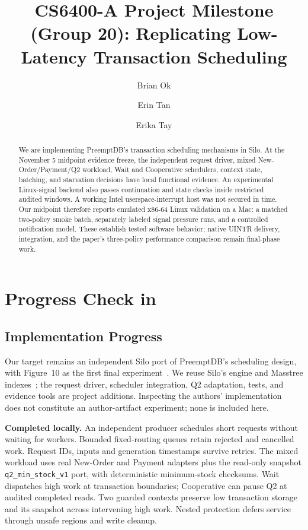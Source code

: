 \documentclass[sigconf,nonacm]{acmart}
\newcommand{\minihead}[1]{{\vspace{.45em}\noindent\textbf{#1.} }}
\begin{document}
\title{CS6400-A Project Milestone (Group 20): Replicating Low-Latency Transaction Scheduling}
\author{Brian Ok}
\author{Erin Tan}
\author{Erika Tay}
\begin{abstract}
We are implementing PreemptDB's transaction scheduling mechanisms in Silo.
At the November 5 midpoint evidence freeze, the independent request driver,
mixed New-Order/Payment/Q2 workload, Wait and Cooperative schedulers, context
state, batching, and starvation decisions have local functional evidence.
An experimental Linux-signal backend also passes continuation and state checks
inside restricted audited windows. A working Intel userspace-interrupt host
was not secured in time. Our midpoint therefore reports emulated x86-64 Linux
validation on a Mac: a matched two-policy smoke batch, separately labeled
signal pressure runs, and a controlled notification model. These establish
tested software behavior; native UINTR delivery, integration, and the paper's
three-policy performance comparison remain final-phase work.
\end{abstract}
\maketitle
\pagestyle{plain}
\raggedbottom

\section{Progress Check in}
\subsection{Implementation Progress}
Our target remains an independent Silo port of PreemptDB's scheduling design,
with Figure~10 as the first final experiment~\cite{huang2025preemptdb}.
We reuse Silo's engine and Masstree indexes~\cite{Tu2013Silo,silocode}; the
request driver, scheduler integration, Q2 adaptation, tests, and evidence tools
are project additions. Inspecting the authors' implementation~\cite{preemptcode}
does not constitute an author-artifact experiment; none is included here.

\minihead{Completed locally}
An independent producer schedules short requests without waiting for workers.
Bounded fixed-routing queues retain rejected and cancelled work. Request IDs,
inputs and generation timestamps survive retries. The mixed workload uses
real New-Order and Payment adapters plus the read-only snapshot
\texttt{q2\_min\_stock\_v1} port, with deterministic minimum-stock checksums.
Wait dispatches high work at transaction boundaries; Cooperative can pause Q2
at audited completed reads. Two guarded contexts preserve low transaction
storage and its snapshot across intervening high work. Nested protection
defers service through unsafe regions and write cleanup.
\end{document}
